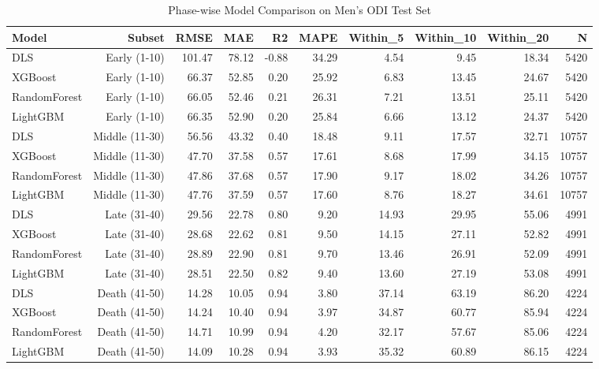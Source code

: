 \begin{table}[htbp]
\centering
\caption{Phase-wise Model Comparison on Men's ODI Test Set}
\label{tab:phase_comparison}
\begin{tabular}{lrrrrrrrrr}
\toprule
Model & Subset & RMSE & MAE & R2 & MAPE & Within_5 & Within_10 & Within_20 & N \\
\midrule
DLS & Early (1-10) & 101.47 & 78.12 & -0.88 & 34.29 & 4.54 & 9.45 & 18.34 & 5420 \\
XGBoost & Early (1-10) & 66.37 & 52.85 & 0.20 & 25.92 & 6.83 & 13.45 & 24.67 & 5420 \\
RandomForest & Early (1-10) & 66.05 & 52.46 & 0.21 & 26.31 & 7.21 & 13.51 & 25.11 & 5420 \\
LightGBM & Early (1-10) & 66.35 & 52.90 & 0.20 & 25.84 & 6.66 & 13.12 & 24.37 & 5420 \\
DLS & Middle (11-30) & 56.56 & 43.32 & 0.40 & 18.48 & 9.11 & 17.57 & 32.71 & 10757 \\
XGBoost & Middle (11-30) & 47.70 & 37.58 & 0.57 & 17.61 & 8.68 & 17.99 & 34.15 & 10757 \\
RandomForest & Middle (11-30) & 47.86 & 37.68 & 0.57 & 17.90 & 9.17 & 18.02 & 34.26 & 10757 \\
LightGBM & Middle (11-30) & 47.76 & 37.59 & 0.57 & 17.60 & 8.76 & 18.27 & 34.61 & 10757 \\
DLS & Late (31-40) & 29.56 & 22.78 & 0.80 & 9.20 & 14.93 & 29.95 & 55.06 & 4991 \\
XGBoost & Late (31-40) & 28.68 & 22.62 & 0.81 & 9.50 & 14.15 & 27.11 & 52.82 & 4991 \\
RandomForest & Late (31-40) & 28.89 & 22.90 & 0.81 & 9.70 & 13.46 & 26.91 & 52.09 & 4991 \\
LightGBM & Late (31-40) & 28.51 & 22.50 & 0.82 & 9.40 & 13.60 & 27.19 & 53.08 & 4991 \\
DLS & Death (41-50) & 14.28 & 10.05 & 0.94 & 3.80 & 37.14 & 63.19 & 86.20 & 4224 \\
XGBoost & Death (41-50) & 14.24 & 10.40 & 0.94 & 3.97 & 34.87 & 60.77 & 85.94 & 4224 \\
RandomForest & Death (41-50) & 14.71 & 10.99 & 0.94 & 4.20 & 32.17 & 57.67 & 85.06 & 4224 \\
LightGBM & Death (41-50) & 14.09 & 10.28 & 0.94 & 3.93 & 35.32 & 60.89 & 86.15 & 4224 \\
\bottomrule
\end{tabular}
\end{table}